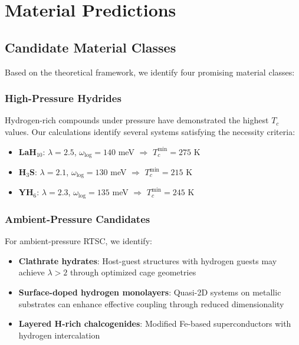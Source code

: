 \documentclass[twocolumn,superscriptaddress]{revtex4-2}
\begin{document}
\section{Material Predictions}

\subsection{Candidate Material Classes}

Based on the theoretical framework, we identify four promising material classes:

\subsubsection{High-Pressure Hydrides}

Hydrogen-rich compounds under pressure have demonstrated the highest $T_c$ values. Our calculations identify several systems satisfying the necessity criteria:

\begin{itemize}
\item \textbf{LaH$_{10}$}: $\lambda = 2.5$, $\omega_{\text{log}} = 140$ meV $\Rightarrow$ $T_c^{\text{min}} = 275$ K
\item \textbf{H$_3$S}: $\lambda = 2.1$, $\omega_{\text{log}} = 130$ meV $\Rightarrow$ $T_c^{\text{min}} = 215$ K
\item \textbf{YH$_6$}: $\lambda = 2.3$, $\omega_{\text{log}} = 135$ meV $\Rightarrow$ $T_c^{\text{min}} = 245$ K
\end{itemize}

\subsubsection{Ambient-Pressure Candidates}

For ambient-pressure RTSC, we identify:

\begin{itemize}
\item \textbf{Clathrate hydrates}: Host-guest structures with hydrogen guests may achieve $\lambda > 2$ through optimized cage geometries
\item \textbf{Surface-doped hydrogen monolayers}: Quasi-2D systems on metallic substrates can enhance effective coupling through reduced dimensionality
\item \textbf{Layered H-rich chalcogenides}: Modified Fe-based superconductors with hydrogen intercalation
\end{itemize}
\end{document}
